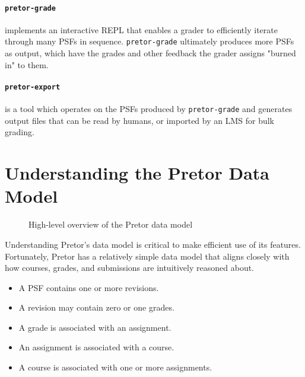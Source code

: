 \documentclass{book}
\begin{document}
\paragraph{\texttt{pretor-grade}} implements an interactive REPL that enables a
grader to efficiently iterate through many PSFs in sequence.
\texttt{pretor-grade} ultimately produces more PSFs as output, which have the
grades and other feedback the grader assigns "burned in" to them.

\paragraph{\texttt{pretor-export}} is a tool which operates on the PSFs
produced by \texttt{pretor-grade} and generates output files that can be read
by humans, or imported by an LMS for bulk grading.

\section{Understanding the Pretor Data Model}

\begin{figure}[H]

	\centering


	\caption{High-level overview of the Pretor data model
	\label{fig:datamodel}}

\end{figure}

Understanding Pretor's data model is critical to make efficient use of its
features. Fortunately, Pretor has a relatively simple data model that aligns
closely with how courses, grades, and submissions are intuitively reasoned
about.

\begin{itemize}

	\item A PSF contains one or more revisions.

	\item A revision may contain zero or one grades.

	\item A grade is associated with an assignment.

	\item An assignment is associated with a course.

	\item A course is associated with one or more assignments.

\end{itemize}
\end{document}
